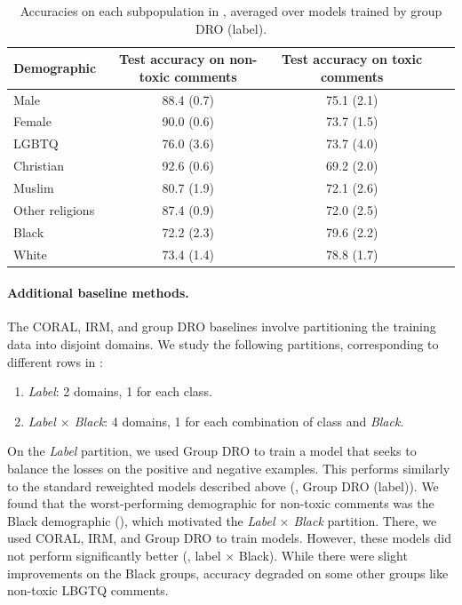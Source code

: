 \begin{table}[!h]
  \caption{Accuracies on each subpopulation in \CivilComments, averaged over models trained by group DRO (label).}
  \label{tab:groupresults_y_civilcomments}
  \centering
  \begin{tabular}{lcccc}
  \toprule
  Demographic & Test accuracy on non-toxic comments & Test accuracy on toxic comments\\
  \midrule
  Male                & 88.4 (0.7) & 75.1 (2.1) \\
  Female              & 90.0 (0.6) & 73.7 (1.5) \\
  LGBTQ               & 76.0 (3.6) & 73.7 (4.0) \\
  Christian           & 92.6 (0.6) & 69.2 (2.0) \\
  Muslim              & 80.7 (1.9) & 72.1 (2.6) \\
  Other religions     & 87.4 (0.9) & 72.0 (2.5) \\
  Black               & 72.2 (2.3) & 79.6 (2.2) \\
  White               & 73.4 (1.4) & 78.8 (1.7) \\
  \bottomrule
  \end{tabular}
\end{table}

\paragraph{Additional baseline methods.}
The CORAL, IRM, and group DRO baselines involve partitioning the training data into disjoint domains.
We study the following partitions, corresponding to different rows in :
\begin{enumerate}
  \item \textit{Label}: 2 domains, 1 for each class.
  \item \textit{Label $\times$ Black}: 4 domains, 1 for each combination of class and \textit{Black}.
\end{enumerate}

On the \textit{Label} partition, we used Group DRO to train a model that seeks to balance the losses on the positive and negative examples. This performs similarly to the standard reweighted models described above
(, Group DRO (label)).
We found that the worst-performing demographic for non-toxic comments was the Black demographic (), which motivated the \textit{Label $\times$ Black} partition. There, we used CORAL, IRM, and Group DRO to train models. However, these models did not perform significantly better (, label $\times$ Black). While there were slight improvements on the Black groups, accuracy degraded on some other groups like non-toxic LBGTQ comments.

